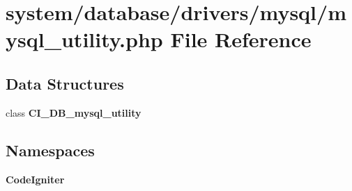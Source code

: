 \section{system/database/drivers/mysql/mysql\-\_\-utility.php File Reference}
\label{mysql__utility_8php}
\subsection*{Data Structures}
\begin{DoxyCompactItemize}
\item 
class {\bf C\-I\-\_\-\-D\-B\-\_\-mysql\-\_\-utility}
\end{DoxyCompactItemize}
\subsection*{Namespaces}
\begin{DoxyCompactItemize}
\item 
{\bf Code\-Igniter}
\end{DoxyCompactItemize}
